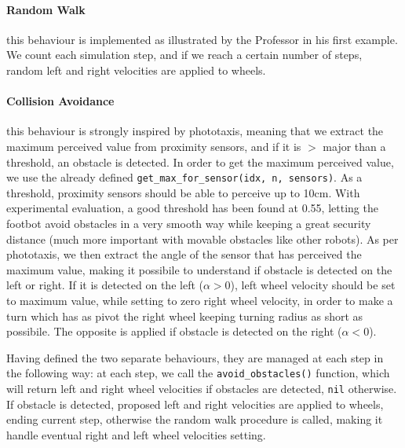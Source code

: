 \paragraph{Random Walk} this behaviour is implemented as illustrated by the
Professor in his first example. We count each simulation step, and if we reach
a certain number of steps, random left and right velocities are applied to
wheels.

\paragraph{Collision Avoidance} this behaviour is strongly inspired by
phototaxis, meaning that we extract the maximum perceived value from proximity
sensors, and if it is $>$ major than a threshold, an obstacle is detected. In
order to get the maximum perceived value, we use the already defined
\texttt{get\_max\_for\_sensor(idx, n, sensors)}. As a threshold, proximity
sensors should be able to perceive up to 10cm. With experimental evaluation, a
good threshold has been found at 0.55, letting the footbot avoid obstacles in a
very smooth way while keeping a great security distance (much more important
with movable obstacles like other robots). As per phototaxis, we then extract
the angle of the sensor that has perceived the maximum value, making it
possibile to understand if obstacle is detected on the left or right. If it is
detected on the left ($\alpha > 0$), left wheel velocity should be set to
maximum value, while setting to zero right wheel velocity, in order to make a
turn which has as pivot the right wheel keeping turning radius as short as
possibile. The opposite is applied if obstacle is detected on the right
($\alpha < 0$).

\bigskip
\noindent
Having defined the two separate behaviours, they are managed at each step in
the following way: at each step, we call the \texttt{avoid\_obstacles()}
function, which will return left and right wheel velocities if obstacles are
detected, \texttt{nil} otherwise. If obstacle is detected, proposed left and
right velocities are applied to wheels, ending current step, otherwise the
random walk procedure is called, making it handle eventual right and left wheel
velocities setting.
